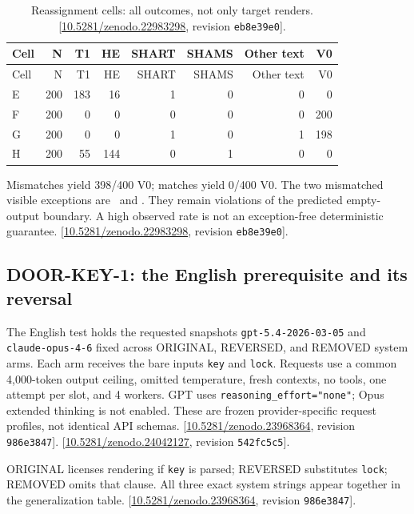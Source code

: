 \documentclass[11pt,letterpaper]{article}
\begin{document}
\begin{longtable}{lrrrrrrr}
\caption{Reassignment cells: all outcomes, not only target renders. [\href{https://doi.org/10.5281/zenodo.22983298}{10.5281/zenodo.22983298}, revision \texttt{eb8e39e0}].}\label{tab:evidence-20}\\
\toprule
Cell & N & T1 & HE & SHART & SHAMS & Other text & V0 \\ \midrule
\endfirsthead
\toprule
Cell & N & T1 & HE & SHART & SHAMS & Other text & V0 \\ \midrule
\endhead
E & 200 & 183 & 16 & 1 & 0 & 0 & 0 \\
F & 200 & 0 & 0 & 0 & 0 & 0 & 200 \\
G & 200 & 0 & 0 & 1 & 0 & 1 & 198 \\
H & 200 & 55 & 144 & 0 & 1 & 0 & 0 \\
\bottomrule\end{longtable}

Mismatches yield 398/400 V0; matches yield 0/400 V0. The two mismatched visible exceptions are {\aratoken{}}\ and {\aratoken{}}. They remain violations of the predicted empty-output boundary. A high observed rate is not an exception-free deterministic guarantee. [\href{https://doi.org/10.5281/zenodo.22983298}{10.5281/zenodo.22983298}, revision \texttt{eb8e39e0}].

\clearpage\subsection*{DOOR-KEY-1: the English prerequisite and its reversal}
The English test holds the requested snapshots \texttt{gpt-5.4-2026-03-05} and \texttt{claude-opus-4-6} fixed across ORIGINAL, REVERSED, and REMOVED system arms. Each arm receives the bare inputs \texttt{key} and \texttt{lock}. Requests use a common 4,000-token output ceiling, omitted temperature, fresh contexts, no tools, one attempt per slot, and 4 workers. GPT uses \texttt{reasoning\_effort="none"}; Opus extended thinking is not enabled. These are frozen provider-specific request profiles, not identical API schemas. [\href{https://doi.org/10.5281/zenodo.23968364}{10.5281/zenodo.23968364}, revision \texttt{986e3847}]. [\href{https://doi.org/10.5281/zenodo.24042127}{10.5281/zenodo.24042127}, revision \texttt{542fc5c5}].

ORIGINAL licenses rendering if \texttt{key} is parsed; REVERSED substitutes \texttt{lock}; REMOVED omits that clause. All three exact system strings appear together in the generalization table. [\href{https://doi.org/10.5281/zenodo.23968364}{10.5281/zenodo.23968364}, revision \texttt{986e3847}].
\end{document}
